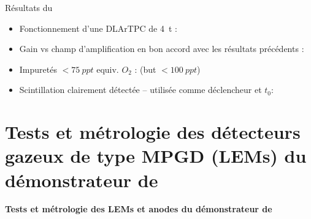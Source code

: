    \begin{frame}{Résultats du \TOO{}}
        \begin{itemize}
           	\item Fonctionnement d'une DLArTPC de \SI{4}{\tonne} : \textcolor{green}{\checkmark}
            \item Gain vs champ d'amplification en bon accord avec les résultats précédents : \textcolor{green}{\checkmark}
         	\item Impuretés $<\SI{75}{ppt}$ equiv. $O_2$ : \textcolor{green}{\checkmark} (but $<\SI{100}{ppt}$)
         	\item Scintillation clairement détectée --  utilisée comme déclencheur et $t_0$: \textcolor{green}{\checkmark}
       	\end{itemize}
   	\end{frame}
    
    \section[\SSS{}]{Tests et métrologie des détecteurs gazeux de type MPGD (LEMs) du démonstrateur de \SSS{}}

    {
        \begin{specialframe}
            \vspace{2cm}\hspace*{-1.8cm}\parbox[t]{\textwidth}{
                \begin{center}
                    \begin{huge}
                            \textcolor{pheniics_purple}{\textbf{Tests et métrologie des LEMs et anodes du démonstrateur de \SSS{}}}
                    \end{huge}
                \end{center}
            }
        \end{specialframe}
    }

